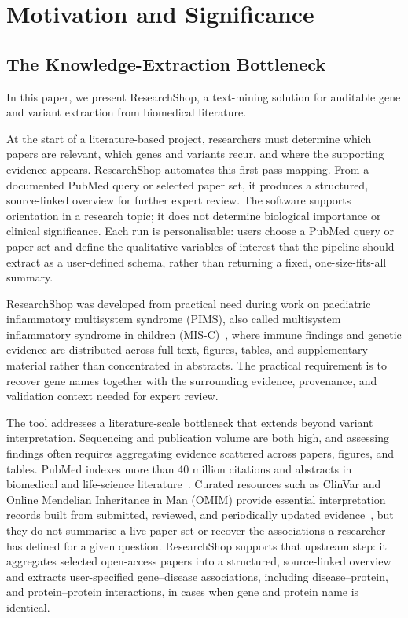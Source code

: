 \section{Motivation and Significance}
\label{sec:motivation}

\subsection{The Knowledge-Extraction Bottleneck}

In this paper, we present ResearchShop, a text-mining solution for auditable gene and variant extraction from biomedical literature.

At the start of a literature-based project, researchers must determine which papers are relevant, which genes and variants recur, and where the supporting evidence appears. ResearchShop automates this first-pass mapping. From a documented PubMed query or selected paper set, it produces a structured, source-linked overview for further expert review. The software supports orientation in a research topic; it does not determine biological importance or clinical significance. Each run is personalisable: users choose a PubMed query or paper set and define the qualitative variables of interest that the pipeline should extract as a user-defined schema, rather than returning a fixed, one-size-fits-all summary.

ResearchShop was developed from practical need during work on paediatric inflammatory multisystem syndrome (PIMS), also called multisystem inflammatory syndrome in children (MIS-C)~\cite{who2020misc}, where immune findings and genetic evidence are distributed across full text, figures, tables, and supplementary material rather than concentrated in abstracts. The practical requirement is to recover gene names together with the surrounding evidence, provenance, and validation context needed for expert review.

The tool addresses a literature-scale bottleneck that extends beyond variant interpretation. Sequencing and publication volume are both high, and assessing findings often requires aggregating evidence scattered across papers, figures, and tables. PubMed indexes more than 40 million citations and abstracts in biomedical and life-science literature~\cite{pubmed_about_2026}. Curated resources such as ClinVar and Online Mendelian Inheritance in Man (OMIM) provide essential interpretation records built from submitted, reviewed, and periodically updated evidence~\cite{landrum2025clinvar,amberger2015omim}, but they do not summarise a live paper set or recover the associations a researcher has defined for a given question. ResearchShop supports that upstream step: it aggregates selected open-access papers into a structured, source-linked overview and extracts user-specified gene--disease associations, including disease--protein, and protein--protein interactions, in cases when gene and protein name is identical.

